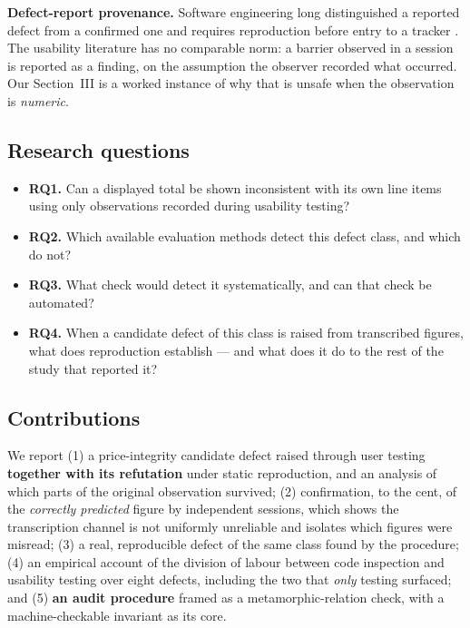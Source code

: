 \documentclass[conference]{IEEEtran}
\begin{document}
\textbf{Defect-report provenance.} Software engineering long distinguished a reported defect from a
confirmed one and requires reproduction before entry to a tracker \cite{sei2002}. The usability
literature has no comparable norm: a barrier observed in a session is reported as a finding, on the
assumption the observer recorded what occurred. Our Section~III is a worked instance of why that is
unsafe when the observation is \emph{numeric}.

\subsection{Research questions}

\begin{itemize}
\item \textbf{RQ1.} Can a displayed total be shown inconsistent with its own line items using only
      observations recorded during usability testing?
\item \textbf{RQ2.} Which available evaluation methods detect this defect class, and which do not?
\item \textbf{RQ3.} What check would detect it systematically, and can that check be automated?
\item \textbf{RQ4.} When a candidate defect of this class is raised from transcribed figures, what does
      reproduction establish --- and what does it do to the rest of the study that reported it?
\end{itemize}

\subsection{Contributions}

We report (1) a price-integrity candidate defect raised through user testing \textbf{together with its
refutation} under static reproduction, and an analysis of which parts of the original observation
survived; (2) confirmation, to the cent, of the \emph{correctly predicted} figure by independent
sessions, which shows the transcription channel is not uniformly unreliable and isolates which figures
were misread; (3) a real, reproducible defect of the same class found by the procedure; (4) an
empirical account of the division of labour between code inspection and usability testing over eight
defects, including the two that \emph{only} testing surfaced; and (5) \textbf{an audit procedure} framed
as a metamorphic-relation check, with a machine-checkable invariant as its core.
\end{document}
